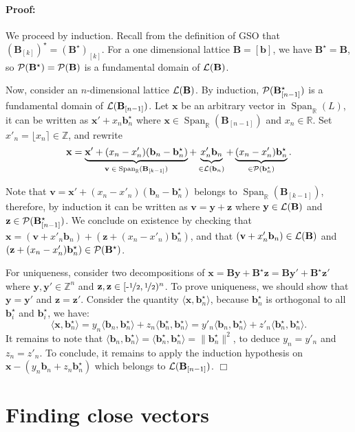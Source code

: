 \documentclass[12pt]{article}
\renewcommand{\vec}{\mathbf}
\newcommand{\ps}[2]{\langle {#1}, {#2} \rangle}
\newcommand{\Z}{\mathbb Z}
\newcommand{\R}{\mathbb R}
\newcommand{\norm}[1]{\|#1\|}
\newcommand{\Span}{\ensuremath{\operatorname{Span}}}
\newenvironment{proof}{\paragraph{Proof:} }{\hfill\qed\\}
\newcommand{\qed}{\hfill \ensuremath{\Box}}
\newcommand{\half}{\ensuremath{\nicefrac 1 2}}
\newcommand{\halfinterval}{\ensuremath{[\mbox{-} \half,\half)}}
\begin{document}
\begin{proof}
We proceed by induction. Recall from the definition of GSO that $(\vec B_{[k]})^\star = (\vec B^\star)_{[k]}$.
For a one dimensional lattice $\vec B = [\vec b]$, we have $\vec B^\star = \vec B$, so 
$\cP(\vec B^\star)=\cP(\vec B)$ is a fundamental domain of $\cL(\vec B)$.

Now, consider an $n$-dimensional lattice $\cL(\vec B)$. By induction, $\cP(\vec B_{[n-1]}^\star)$ is a fundamental domain
of $\cL(\vec B_{[n-1]})$. Let $\vec x$ be an arbitrary vector in  $\Span_\R(L)$, it can be written as 
$\vec x' + x_n \vec b^\star_n$ where $\vec x \in \Span_\R(\vec B_{[n-1]})$ and $x_n \in \R$. 
Set $x'_n = \lfloor x_n \rceil \in \Z$, and rewrite 
\[\vec x = \underbrace{\vec x' + (x_n -x'_n) (\vec b_n - \vec b_n^\star)}_{\vec v\; \in\;  \Span_\R(\vec B_{[k-1]})} + \underbrace{x'_n \vec b_n}_{\in \cL(\vec b_n)} + \underbrace{(x_n -x'_n) \vec b^\star_n}_{\in \cP(\vec b_n^\star)}.\]

Note that $\vec v = \vec x' + (x_n -x'_n) (\vec b_n - \vec b_n^\star)$ belongs to $\Span_\R(\vec B_{[k-1]})$,
therefore, by induction it can be written as $\vec v = \vec y + \vec z$ where $\vec y \in \cL(\vec B)$ and
$\vec z \in \cP(\vec B^\star_{[n-1]})$. We conclude on existence by checking that 
$\vec x = (\vec v + x'_n \vec b_n) + (\vec z + (x_n -x'_n) \vec b^\star_n)$, and that
$ (\vec v + x'_n \vec b_n) \in \cL(\vec B)$ and $(\vec z + (x_n -x'_n) \vec b^\star_n) \in \cP(\vec B^\star)$.

For uniqueness, consider two decompositions of $\vec x = \vec B\vec y + \vec B^\star \vec z = \vec B \vec y' + \vec B^\star \vec z'$ where $\vec y, \vec y' \in \Z^n$ and $\vec z, \vec z \in \halfinterval^n$. To prove uniqueness, we should show that $\vec y = \vec y'$ and $\vec z = \vec z'$. Consider the quantity $\ps{\vec x}{\vec b^\star_n}$, 
because $\vec b_n^\star$ is orthogonal to all $\vec b_i^\star$ and $\vec b_i^\star$, we have:
\[ \ps{\vec x}{\vec b^\star_n} = y_n \ps{\vec b_n}{\vec b_n^\star} + z_n \ps{\vec b_n^\star}{\vec b_n^\star}
= y'_n \ps{\vec b_n}{\vec b_n^\star} + z'_n \ps{\vec b_n^\star}{\vec b_n^\star}. \] It remains to note
that $\ps{\vec b_n}{\vec b_n^\star} = \ps{\vec b_n^\star}{\vec b_n^\star} = \norm{\vec b_n^\star}^2$,
to deduce $y_n = y'_n$ and $z_n = z'_n$. To conclude, it remains to apply the induction hypothesis on
$\vec x - (y_n \vec b_n + z_n \vec b^\star_n)$ which belongs to $\cL(\vec B_{[n-1]})$.
\end{proof}

\section{Finding close vectors}
\end{document}
